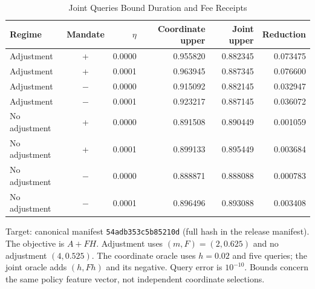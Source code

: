 \begin{table}[t]
\caption{Joint Queries Bound Duration and Fee Receipts}\label{tab:joint}
\centering
\footnotesize
\begin{tabular}{@{}lcrrrr@{}}
\toprule
Regime & Mandate & $\eta$ & Coordinate upper & Joint upper & Reduction \\
\midrule
Adjustment & + & 0.0000 & 0.955820 & 0.882345 & 0.073475 \\
Adjustment & + & 0.0001 & 0.963945 & 0.887345 & 0.076600 \\
Adjustment & $-$ & 0.0000 & 0.915092 & 0.882145 & 0.032947 \\
Adjustment & $-$ & 0.0001 & 0.923217 & 0.887145 & 0.036072 \\
No adjustment & + & 0.0000 & 0.891508 & 0.890449 & 0.001059 \\
No adjustment & + & 0.0001 & 0.899133 & 0.895449 & 0.003684 \\
No adjustment & $-$ & 0.0000 & 0.888871 & 0.888088 & 0.000783 \\
No adjustment & $-$ & 0.0001 & 0.896496 & 0.893088 & 0.003408 \\
\bottomrule
\end{tabular}
\par\smallskip\begin{minipage}{\linewidth}\footnotesize Target: canonical manifest \texttt{54adb353c5b85210d} (full hash in the release manifest). The objective is $A+FH$. Adjustment uses $(m,F)=(2,0.625)$ and no adjustment $(4,0.525)$. The coordinate oracle uses $h=0.02$ and five queries; the joint oracle adds $(h,Fh)$ and its negative. Query error is $10^{-10}$. Bounds concern the same policy feature vector, not independent coordinate selections.\end{minipage}
\end{table}
